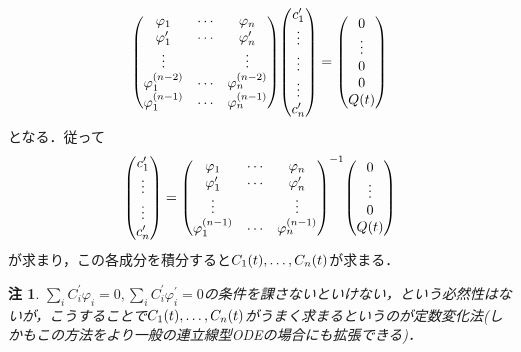 \documentclass[autodetect-engine,dvipdfmx-if-dvi,ja=standard]{bxjsarticle}
\theoremstyle{mystyle1}
\theoremstyle{mystyle2}
\newtheorem{note}{注}
\begin{document}
\begin{align*}
  \mqty(\varphi_1       & \cdots & \varphi_n             \\
  \varphi_1^\prime      & \cdots & \varphi_n^\prime      \\
  \vdots                &        & \vdots                \\
  \varphi_1^{\qty(n-2)} & \cdots & \varphi_n^{\qty(n-2)} \\
  \varphi_1^{\qty(n-1)} & \cdots & \varphi_n^{\qty(n-1)}
  )\mqty(
  c_1^\prime                                             \\\vdots\\\vdots\\\vdots\\c_n^\prime
  )=\mqty(
  0                                                      \\\vdots\\0\\0\\Q\qty(t)
  )
\end{align*}となる．従って\begin{align*}
  \mqty(
  c_1^\prime                                             \\\vdots\\\vdots\\c_n^\prime
  )=\mqty(\varphi_1     & \cdots & \varphi_n             \\
  \varphi_1^\prime      & \cdots & \varphi_n^\prime      \\
  \vdots                &        & \vdots                \\
  \varphi_1^{\qty(n-1)} & \cdots & \varphi_n^{\qty(n-1)}
  )^{-1}\mqty(
  0                                                      \\\vdots\\0\\Q\qty(t)
  )
\end{align*}が求まり，この各成分を積分すると$C_1\qty(t),\ldots,C_n\qty(t)$が求まる．
\begin{note}
  $\sum_iC_i^\prime \varphi_i=0,\sum_iC_i^\prime \varphi_i^\prime =0$の条件を課さないといけない，という必然性はないが，こうすることで$C_1\qty(t),\ldots,C_n\qty(t)$がうまく求まるというのが定数変化法(しかもこの方法をより一般の連立線型ODEの場合にも拡張できる)．
\end{note}
\end{document}
